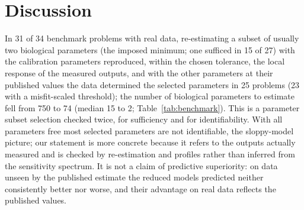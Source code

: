 \documentclass[pdflatex,sn-nature]{sn-jnl}
\theoremstyle{plain}
\begin{document}
\begin{table}[!htbp]
\caption{\textbf{What the formal verification guarantees.} For each step of the method, the modules of the Lean development (numbers of Supplementary Table~\ref{S-tab:modules}), the statement proved for any model that satisfies the stated hypotheses, the condition under which it applies to a numerical result, and the results of this study to which it applies. Levels of guarantee and identifiability per problem are given in Table~\ref{tab:benchmark}; the formal statements are listed in Supplementary Table~\ref{S-tab:statements}, the scope of each guarantee in Supplementary Table~\ref{S-tab:scope}, and the correspondence between each claim of this paper and the Lean theorem that supports it in Supplementary Table~\ref{S-tab:claims}.}
\label{tab:lean}
\centering
\scriptsize

\end{table}

\section*{Discussion}\label{sec:discussion}

In 31 of 34 benchmark problems with real data, re-estimating a subset of usually two biological parameters (the imposed minimum; one sufficed in 15 of 27) with the calibration parameters reproduced, within the chosen tolerance, the local response of the measured outputs, and with the other parameters at their published values the data determined the selected parameters in 25 problems (23 with a misfit-scaled threshold); the number of biological parameters to estimate fell from 750 to 74 (median 15 to 2; Table~\ref{tab:benchmark}). This is a parameter subset selection\cite{bib40} checked twice, for sufficiency and for identifiability. With all parameters free most selected parameters are not identifiable, the sloppy-model picture\cite{bib15,bib41}; our statement is more concrete because it refers to the outputs actually measured and is checked by re-estimation and profiles rather than inferred from the sensitivity spectrum. It is not a claim of predictive superiority: on data unseen by the published estimate the reduced models predicted neither consistently better nor worse, and their advantage on real data reflects the published values.
\end{document}
